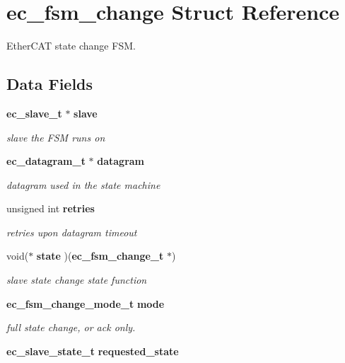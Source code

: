 \section{ec\-\_\-fsm\-\_\-change \-Struct \-Reference}
\label{structec__fsm__change}


\-Ether\-C\-A\-T state change \-F\-S\-M.  


\subsection*{\-Data \-Fields}
\begin{DoxyCompactItemize}
\item 
{\bf ec\-\_\-slave\-\_\-t} $\ast$ {\bf slave}\label{structec__fsm__change_ae3843c25b9fd49665931655cafc21b3d}

\begin{DoxyCompactList}\small\item\em slave the \-F\-S\-M runs on \end{DoxyCompactList}\item 
{\bf ec\-\_\-datagram\-\_\-t} $\ast$ {\bf datagram}\label{structec__fsm__change_ab273d6047105421f11b993301269dea3}

\begin{DoxyCompactList}\small\item\em datagram used in the state machine \end{DoxyCompactList}\item 
unsigned int {\bf retries}\label{structec__fsm__change_a00a1bc8fab1ccbed6b723bebb19ae34b}

\begin{DoxyCompactList}\small\item\em retries upon datagram timeout \end{DoxyCompactList}\item 
void($\ast$ {\bf state} )({\bf ec\-\_\-fsm\-\_\-change\-\_\-t} $\ast$)\label{structec__fsm__change_a3026434d1cab8f98a4ca535ae6a54382}

\begin{DoxyCompactList}\small\item\em slave state change state function \end{DoxyCompactList}\item 
{\bf ec\-\_\-fsm\-\_\-change\-\_\-mode\-\_\-t} {\bf mode}
\begin{DoxyCompactList}\small\item\em full state change, or ack only. \end{DoxyCompactList}\item 
{\bf ec\-\_\-slave\-\_\-state\-\_\-t} {\bf requested\-\_\-state}\label{structec__fsm__change_a64a969bd6bad475ff30870eed7f79266}


\end{DoxyCompactItemize}
